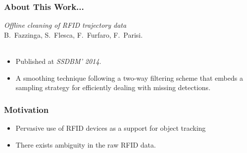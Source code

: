 \begin{frame}
\frametitle{About This Work...}

\emph{Offline cleaning of RFID trajectory data}~\cite{fazzinga2014offline}\\
B.~Fazzinga, S.~Flesca, F.~Furfaro, F.~Parisi.\\~\\

\begin{itemize}
  \item Published at \emph{SSDBM' 2014}.
  \item A smoothing technique following a two-way filtering scheme that embeds a sampling strategy for efficiently dealing with missing detections.
\end{itemize}

\end{frame}


\begin{frame}
\frametitle{Motivation}

\begin{itemize}
  \item Pervasive use of RFID devices as a support for object tracking
  \item There exists ambiguity in the raw RFID data.
\end{itemize}

\end{frame}


